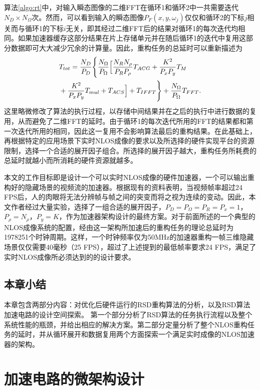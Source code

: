 \documentclass[master]{shtthesis}             %
\begin{document}
算法\ref{algo:rt}中，对输入瞬态图像的二维FFT在循环1和循环2中一共需要迭代$N_D\times N_\Omega$次。然而，可以看到输入的瞬态图像$P_F(x,y,\omega_j)$仅仅和循环2的下标$j$相关而与循环1的下标$i$无关，即其经过二维FFT后的结果对循环1的每次迭代均相同。如果加速器缓存这部分结果在片上存储单元并在随后循环1的迭代中复用这部分数据即可大大减少冗余的计算量。因此，重构任务的总延时可以重新描述为
\begin{equation}
    \begin{split}
        &T_{tot} = \frac{N_D}{P_D} \Biggl\{ \frac{N_{\Omega}}{P_{\Omega}} \Bigl[ \frac{N_{ {R}}N_{\rho}}{P_{ {R}}P_{\rho}} T_{ACG}+\frac{K^2}{P_xP_y}T_M \\ &+ \frac{K^2}{P_xP_y}T_{mul}+T_{ACS} \Bigr] + T_{IFFT}\Biggr\} + \frac{N_{\Omega}}{P_{\Omega}} T_{FFT}. \label{eq:tt}
    \end{split}
\end{equation}
这里略微修改了算法的执行过程，以存储中间结果并在之后的执行中进行数据的复用，从而避免了二维FFT的延时。由于循环1的每次迭代所用的FFT的结果都和第一次迭代所用的相同，因此这一复用不会影响算法最后的重构结果。在此基础上，再根据特定的应用场景下实时NLOS成像的要求以及所选择的硬件实现平台的资源限制，选择一个合适的展开因子组合。所选择的展开因子越大，重构任务所耗费的总延时就越小而所消耗的硬件资源就越多。

本文的工作目标即是设计一个可以实时NLOS成像的硬件加速器，一个可以输出重构好的隐藏场景的视频流的加速器。根据现有的资料表明，当视频帧率超过24 FPS后，人的肉眼将无法分辨帧与帧之间的突变而将之视为连续的变动\citep{read2000restoration}。因此，本文作者经过大量实验，选择了一组合适的展开因子，$P_D=P_\Omega=P_R=P_x=1$，$P_\rho=N_\rho$，$P_y=K$，作为加速器架构设计的最终方案。对于前面所述的一个典型的NLOS成像系统的配置，经由这一架构所加速后的重构任务的理论总延时为1978251个时钟周期。这样，一个时钟频率仅为50MHz的加速器重构一帧三维隐藏场景仅仅需要40毫秒（25 FPS），超过了上述提到的最低帧率要求24 FPS，满足了实时NLOS成像所必须达到的的设计要求。

\section{本章小结}

本章包含两部分内容：对优化后硬件运行的RSD重构算法的分析，以及RSD算法加速电路的设计空间探索。
第一个部分分析了RSD算法的任务执行流程以及整个系统性能的瓶颈，并给出相应的解决方案。第二部分定量分析了整个NLOS重构任务的延时，并从循环展开和数据复用两个方面探索一个满足实时成像的NLOS加速器的架构。

\chapter{加速电路的微架构设计}
\end{document}
